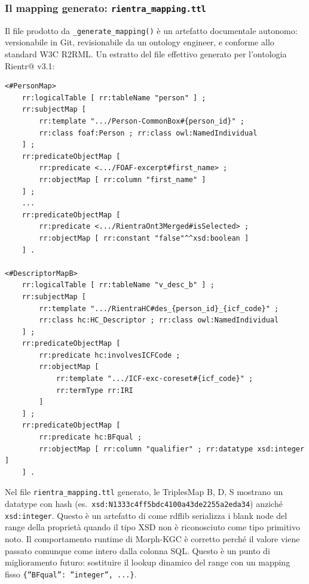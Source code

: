 \documentclass[a4paper,12pt]{article}
\begin{document}
\subsubsection{Il mapping generato: \texttt{rientra\_mapping.ttl}}

Il file prodotto da \texttt{\_generate\_mapping()} \`{e} un artefatto
documentale autonomo: versionabile in Git, revisionabile da un ontology
engineer, e conforme allo standard W3C R2RML. Un estratto del file
effettivo generato per l'ontologia Rientr@ v3.1:

\begin{lstlisting}[caption={Estratto da \texttt{rientra\_mapping.ttl} --- MAP 1 e MAP 3B.}, numbers=none]
<#PersonMap>
    rr:logicalTable [ rr:tableName "person" ] ;
    rr:subjectMap [
        rr:template ".../Person-CommonBox#{person_id}" ;
        rr:class foaf:Person ; rr:class owl:NamedIndividual
    ] ;
    rr:predicateObjectMap [
        rr:predicate <.../FOAF-excerpt#first_name> ;
        rr:objectMap [ rr:column "first_name" ]
    ] ;
    ...
    rr:predicateObjectMap [
        rr:predicate <.../RientraOnt3Merged#isSelected> ;
        rr:objectMap [ rr:constant "false"^^xsd:boolean ]
    ] .

<#DescriptorMapB>
    rr:logicalTable [ rr:tableName "v_desc_b" ] ;
    rr:subjectMap [
        rr:template ".../RientraHC#des_{person_id}_{icf_code}" ;
        rr:class hc:HC_Descriptor ; rr:class owl:NamedIndividual
    ] ;
    rr:predicateObjectMap [
        rr:predicate hc:involvesICFCode ;
        rr:objectMap [
            rr:template ".../ICF-exc-coreset#{icf_code}" ;
            rr:termType rr:IRI
        ]
    ] ;
    rr:predicateObjectMap [
        rr:predicate hc:BFqual ;
        rr:objectMap [ rr:column "qualifier" ; rr:datatype xsd:integer ]
    ] .
\end{lstlisting}

\noindent \begin{warningbox}
Nel file \texttt{rientra\_mapping.ttl} generato, le TriplesMap B, D, S
mostrano un datatype con hash (es.\
\texttt{xsd:N1333c4ff5bdc4100a43de2255a2eda34}) anzich\'{e}
\texttt{xsd:integer}. Questo \`{e} un artefatto di come rdflib serializza
i blank node del range della propriet\`{a} quando il tipo XSD non \`{e}
riconosciuto come tipo primitivo noto. Il comportamento runtime di
Morph-KGC \`{e} corretto perch\'{e} il valore viene passato comunque come
intero dalla colonna SQL. Questo \`{e} un punto di miglioramento futuro:
sostituire il lookup dinamico del range con un mapping fisso
\texttt{\{''BFqual'': ''integer'', ...\}}.
\end{warningbox}
\end{document}
